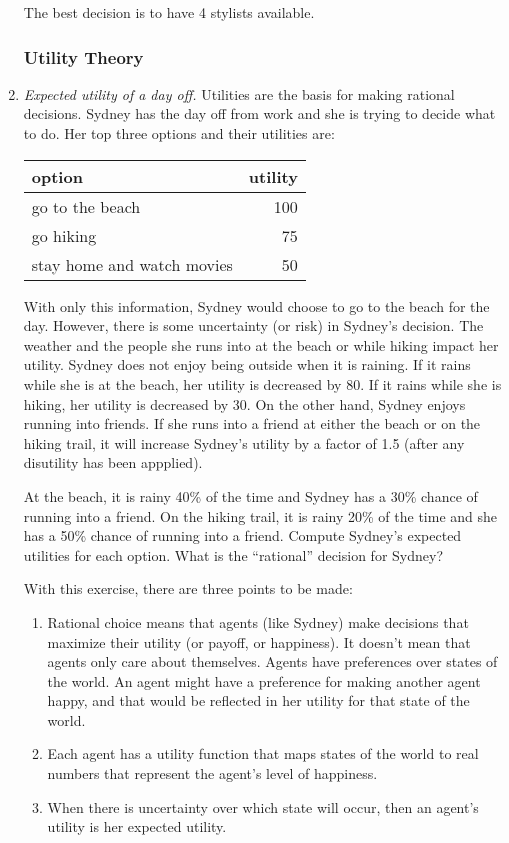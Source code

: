 \begin{enumerate}
\begin{solution}
The best decision is to have 4 stylists available.
\end{solution}

\subsubsection*{Utility Theory}

\item \emph{Expected utility of a day off.}  Utilities are the basis
  for making rational decisions.  Sydney has the day off from work and
  she is trying to decide what to do. Her top three options and their
  utilities are:

\begin{tabular}{lr}
  option & utility \\ \hline
  go to the beach & 100\\
  go hiking & 75\\
  stay home and watch movies & 50
\end{tabular}

With only this information, Sydney would choose to go to the beach for
the day. However, there is some uncertainty (or risk) in Sydney's
decision. The weather and the people she runs into at the beach or
while hiking impact her utility.  Sydney does not enjoy being outside
when it is raining.  If it rains while she is at the beach, her
utility is decreased by 80.  If it rains while she is hiking, her
utility is decreased by 30.  On the other hand, Sydney enjoys running
into friends. If she runs into a friend at either the beach or on the
hiking trail, it will increase Sydney's utility by a factor of 1.5
(after any disutility has been appplied).

At the beach, it is rainy 40\% of the time and Sydney has a 30\%
chance of running into a friend.  On the hiking trail, it is rainy
20\% of the time and she has a 50\% chance of running into a friend.
Compute Sydney's expected utilities for each option. What is the
``rational'' decision for Sydney?

With this exercise, there are three points to be made:
\begin{enumerate}
\item Rational choice means that agents (like Sydney) make decisions 
    that maximize their utility (or payoff, or happiness). It doesn't 
    mean that agents only care about themselves. Agents have 
    preferences over states of the world. An agent might have a preference 
    for making another agent happy, and that would be reflected in her 
    utility for that state of the world.
\item Each agent has a utility function that maps states of the world
    to real numbers that represent the agent's level of happiness.
\item When there is uncertainty over which state will occur, then
    an agent's utility is her expected utility.
\end{enumerate}


\end{enumerate}
